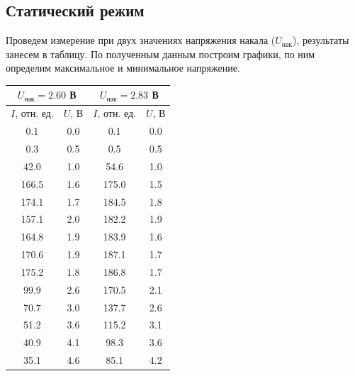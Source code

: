 \documentclass[a4paper,12pt]{article} %
\begin{document}
	\subsection*{Статический режим}
	Проведем измерение при двух значениях напряжения накала ($U_\text{нак}$), результаты занесем в таблицу. По полученным данным построим графики, по ним определим максимальное и минимальное напряжение.
	\begin{table}[H]
		\centering
		\begin{tabular}{|cc|cc|}
			\hline
			\multicolumn{2}{|c|}{$U_\text{нак}   = 2.60$ В} & \multicolumn{2}{c|}{$U_\text{нак}   = 2.83$ В} \\ \hline
			\multicolumn{1}{|c|}{$I$, отн. ед.}       & $U$, В      & \multicolumn{1}{c|}{$I$, отн. ед.}      & $U$, В     \\ \hline
			\multicolumn{1}{|c|}{0.1}     & 0.0    & \multicolumn{1}{c|}{0.1}    & 0.0   \\ \hline
			\multicolumn{1}{|c|}{0.3}     & 0.5    & \multicolumn{1}{c|}{0.5}    & 0.5   \\ \hline
			\multicolumn{1}{|c|}{42.0}    & 1.0    & \multicolumn{1}{c|}{54.6}   & 1.0   \\ \hline
			\multicolumn{1}{|c|}{166.5}   & 1.6    & \multicolumn{1}{c|}{175.0}  & 1.5   \\ \hline
			\multicolumn{1}{|c|}{174.1}   & 1.7    & \multicolumn{1}{c|}{184.5}  & 1.8   \\ \hline
			\multicolumn{1}{|c|}{157.1}   & 2.0    & \multicolumn{1}{c|}{182.2}  & 1.9   \\ \hline
			\multicolumn{1}{|c|}{164.8}   & 1.9    & \multicolumn{1}{c|}{183.9}  & 1.6   \\ \hline
			\multicolumn{1}{|c|}{170.6}   & 1.9    & \multicolumn{1}{c|}{187.1}  & 1.7   \\ \hline
			\multicolumn{1}{|c|}{175.2}   & 1.8    & \multicolumn{1}{c|}{186.8}  & 1.7   \\ \hline
			\multicolumn{1}{|c|}{99.9}    & 2.6    & \multicolumn{1}{c|}{170.5}  & 2.1   \\ \hline
			\multicolumn{1}{|c|}{70.7}    & 3.0    & \multicolumn{1}{c|}{137.7}  & 2.6   \\ \hline
			\multicolumn{1}{|c|}{51.2}    & 3.6    & \multicolumn{1}{c|}{115.2}  & 3.1   \\ \hline
			\multicolumn{1}{|c|}{40.9}    & 4.1    & \multicolumn{1}{c|}{98.3}   & 3.6   \\ \hline
			\multicolumn{1}{|c|}{35.1}    & 4.6    & \multicolumn{1}{c|}{85.1}   & 4.2   \\ \hline

\end{tabular}
\end{table}
\end{document}
